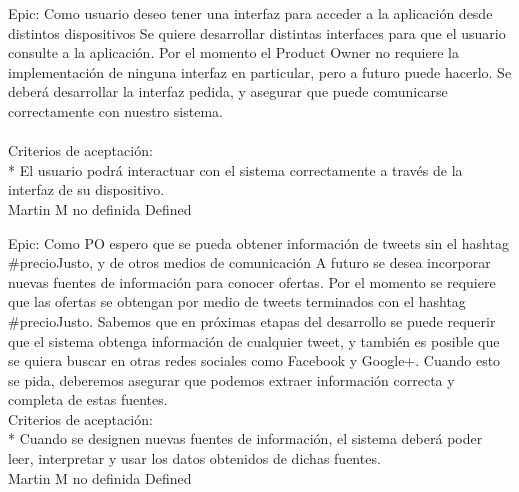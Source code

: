 \vspace{20pt}

	{Epic: Como usuario deseo tener una interfaz para acceder a la aplicación desde distintos dispositivos} %
	{Se quiere desarrollar distintas interfaces para que el usuario consulte a la
aplicación. Por el momento el Product Owner no requiere la implementación de
ninguna interfaz en particular, pero a futuro puede hacerlo. Se deberá
desarrollar la interfaz pedida, y asegurar que puede comunicarse correctamente
con nuestro sistema.\\
  \\
Criterios de aceptación:\\
* El usuario podrá interactuar con el sistema correctamente a través de la interfaz de su dispositivo.\\
} %
	{} %
	{} %
	{Martin M} %
	{no definida} %
	{Defined} %


\vspace{20pt}

	{Epic: Como PO espero que se pueda obtener información de tweets sin el hashtag \#precioJusto, y de otros medios de comunicación} %
	{A futuro se desea incorporar nuevas fuentes de información para conocer
ofertas. Por el momento se requiere que las ofertas se obtengan por medio de
tweets terminados con el hashtag \#precioJusto. Sabemos que en próximas etapas
del desarrollo se puede requerir que el sistema obtenga información de
cualquier tweet, y también es posible que se quiera buscar en otras redes
sociales como Facebook y Google+. Cuando esto se pida, deberemos asegurar que
podemos extraer información correcta y completa de estas fuentes.
  \\
Criterios de aceptación:\\
* Cuando se designen nuevas fuentes de información, el sistema deberá poder leer, interpretar y usar los datos obtenidos de dichas fuentes.\\
} %
	{} %
	{} %
	{Martin M} %
	{no definida} %
	{Defined} %


\vspace{20pt}


